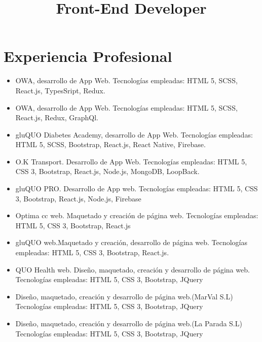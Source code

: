 \documentclass[11pt,a4paper]{moderncv}
\title{Front-End Developer}
\begin{document}
    \maketitle
    \section{Experiencia Profesional}
    {\begin{itemize}
         \item OWA, desarrollo de App Web. Tecnologías empleadas: HTML 5, SCSS, React.js, TypesSript, Redux.
    \end{itemize}
    }
    {\begin{itemize}
         \item OWA, desarrollo de App Web. Tecnologías empleadas: HTML 5, SCSS, React.js, Redux, GraphQl.
    \end{itemize}
    }
    {\begin{itemize}
         \item gluQUO Diabetes Academy, desarrollo de App Web. Tecnologías empleadas: HTML 5, SCSS, Bootstrap, React.js, React Native, Firebase.
         \item O.K Transport. Desarrollo de App Web. Tecnologías empleadas: HTML 5, CSS 3, Bootstrap, React.js, Node.js, MongoDB, LoopBack.
         \item gluQUO PRO. Desarrollo de App web. Tecnologías empleadas: HTML 5, CSS 3, Bootstrap, React.js, Node.js, Firebase
         \item Optima cc web. Maquetado y creación de página web. Tecnologías empleadas: HTML 5, CSS 3, Bootstrap, React.js
         \item gluQUO web.Maquetado y creación, desarrollo de página web. Tecnologías empleadas: HTML 5, CSS 3, Bootstrap, React.js.
         \item QUO Health web. Diseño, maquetado, creación y desarrollo de página web. Tecnologías empleadas: HTML 5, CSS 3, Bootstrap, JQuery
    \end{itemize}
    }
    {
    \begin{itemize}
        \item Diseño, maquetado, creación y desarrollo de página web.(MarVal S.L) Tecnologías empleadas: HTML 5, CSS 3, Bootstrap, JQuery
    \end{itemize}
    \begin{itemize}
        \item Diseño, maquetado, creación y desarrollo de página web.(La Parada S.L) Tecnologías empleadas: HTML 5, CSS 3, Bootstrap, JQuery
    \end{itemize}
    }
\end{document}
